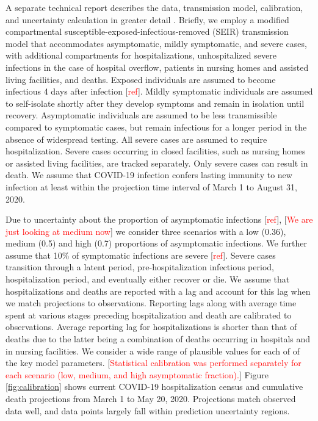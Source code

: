 \documentclass[11pt]{article}
\newcommand{\comment}[1]{[\textcolor{red}{#1}]}
\begin{document}
A separate technical report describes the data, transmission model, calibration, and uncertainty calculation in greater detail \citep{morozova2020tech}.  Briefly, we employ a modified compartmental susceptible-exposed-infectious-removed (SEIR) transmission model that accommodates asymptomatic, mildly symptomatic, and severe cases, with additional compartments for hospitalizations, unhospitalized severe infections in the case of hospital overflow, patients in nursing homes and assisted living facilities, and deaths. 
Exposed individuals are assumed to become infectious 4 days after infection \comment{ref}.  Mildly symptomatic individuals are assumed to self-isolate shortly after they develop symptoms and remain in isolation until recovery. Asymptomatic individuals are assumed to be less transmissible compared to symptomatic cases, but remain infectious for a longer period in the absence of widespread testing. All severe cases are assumed to require hospitalization. Severe cases occurring in closed facilities, such as nursing homes or assisted living facilities, are tracked separately. Only severe cases can result in death. We assume that COVID-19 infection confers lasting immunity to new infection at least within the projection time interval of March 1 to August 31, 2020.  

Due to uncertainty about the proportion of asymptomatic infections \comment{ref}, \comment{We are just looking at medium now} we consider three scenarios with a low (0.36), medium (0.5) and high (0.7) proportions of asymptomatic infections. We further assume that 10\% of symptomatic infections are severe \comment{ref}. Severe cases transition through a latent period, pre-hospitalization infectious period, hospitalization period, and eventually either recover or die. We assume that hospitalizations and deaths are reported with a lag and account for this lag when we match projections to observations. Reporting lags along with average time spent at various stages preceding hospitalization and death are calibrated to observations. Average reporting lag for hospitalizations is shorter than that of deaths due to the latter being a combination of deaths occurring in hospitals and in nursing facilities.  We consider a wide range of plausible values for each of of the key model parameters.  \comment{Statistical calibration was performed separately for each scenario (low, medium, and high asymptomatic fraction).}
Figure \ref{fig:calibration} shows current COVID-19 hospitalization census and cumulative death projections from March 1 to May 20, 2020.  Projections match observed data well, and data points largely fall within prediction uncertainty regions. 
\end{document}
